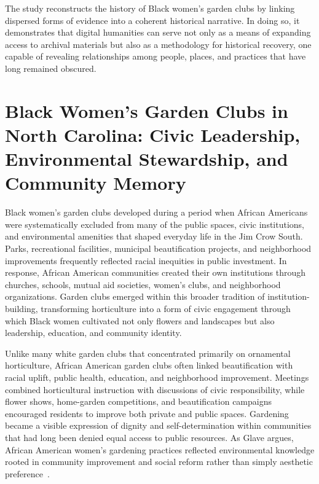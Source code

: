 \documentclass[final]{anthology-ch}
\begin{document}
The study reconstructs the history of Black women's garden clubs by linking dispersed forms of evidence into a coherent historical narrative. In doing so, it demonstrates that digital humanities can serve not only as a means of expanding access to archival materials but also as a methodology for historical recovery, one capable of revealing relationships among people, places, and practices that have long remained obscured.

\section{Black Women's Garden Clubs in North Carolina: Civic Leadership, Environmental Stewardship, and Community Memory} \label{sec:clubs}

Black women's garden clubs developed during a period when African Americans were systematically excluded from many of the public spaces, civic institutions, and environmental amenities that shaped everyday life in the Jim Crow South. Parks, recreational facilities, municipal beautification projects, and neighborhood improvements frequently reflected racial inequities in public investment. In response, African American communities created their own institutions through churches, schools, mutual aid societies, women's clubs, and neighborhood organizations. Garden clubs emerged within this broader tradition of institution-building, transforming horticulture into a form of civic engagement through which Black women cultivated not only flowers and landscapes but also leadership, education, and community identity.

Unlike many white garden clubs that concentrated primarily on ornamental horticulture, African American garden clubs often linked beautification with racial uplift, public health, education, and neighborhood improvement. Meetings combined horticultural instruction with discussions of civic responsibility, while flower shows, home-garden competitions, and beautification campaigns encouraged residents to improve both private and public spaces. Gardening became a visible expression of dignity and self-determination within communities that had long been denied equal access to public resources. As Glave argues, African American women's gardening practices reflected environmental knowledge rooted in community improvement and social reform rather than simply aesthetic preference~\cite[pp.~399--404]{glave2003garden}.
\end{document}
